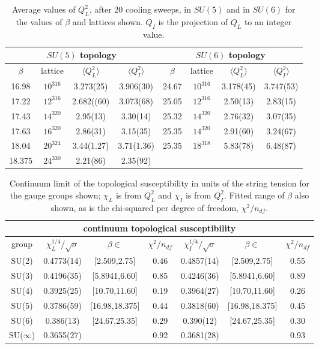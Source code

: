 \documentclass[12pt]{article}
\begin{document}
\begin{table}[htb]
\centering
\begin{tabular}{|c|c|c|c||c|c|c|c|} \hline
\multicolumn{4}{|c|}{$SU(5)$ topology} & \multicolumn{4}{|c|}{$SU(6)$ topology} \\ \hline
$\beta$  &  lattice  & $\langle Q^2_L \rangle$ & $\langle Q_I^2 \rangle$
& $\beta$  &  lattice  & $\langle Q^2_L \rangle$ & $\langle Q_I^2 \rangle$ \\ \hline
16.98   & $10^316$  & 3.273(25)  & 3.906(30) & 24.67   & $10^316$  & 3.178(45)  & 3.747(53) \\
17.22   & $12^316$  & 2.682((60) & 3.073(68) & 25.05   & $12^316$  & 2.50(13)  & 2.83(15) \\
17.43   & $14^320$  & 2.95(13)   & 3.30(14)  & 25.32   & $14^320$  & 2.76(32)  & 3.07(35) \\
17.63   & $16^320$  & 2.86(31)   & 3.15(35)  & 25.35   & $14^320$  & 2.91(60)  & 3.24(67) \\
18.04   & $20^324$  & 3.44(1.27) & 3.71(1.36)& 25.35   & $18^318$  & 5.83(78)  & 6.48(87) \\
18.375  & $24^330$  & 2.21(86)   & 2.35(92)  &    &   &   &  \\ \hline
\end{tabular}
\caption{Average values of $Q^2_L$, after 20 cooling sweeps, in $SU(5)$ and in  $SU(6)$
  for the values of $\beta$ and lattices shown.
  $Q_I$ is the projection of $Q_L$ to an integer value.}
\label{table_QQ_SU5_SU6}
\end{table}



\begin{table}[htb]
\centering
\begin{tabular}{|c|ccc|ccc|} \hline
\multicolumn{7}{|c|}{continuum topological susceptibility} \\ \hline
group  &  $\chi_L^{1/4}/\surd\sigma$ & $\beta\in$ & $\chi^2/n_{df}$ & $\chi_I^{1/4}/\surd\sigma$ & $\beta\in$ & $\chi^2/n_{df}$  \\ \hline
SU(2) & 0.4773(14) & [2.509,2.75]   & 0.46 & 0.4857(14) & [2.509,2.75]   & 0.55 \\
SU(3) & 0.4196(35) & [5.8941,6.60]  & 0.85 & 0.4246(36) & [5.8941,6.60]  & 0.89 \\
SU(4) & 0.3925(25) & [10.70,11.60]  & 0.19 & 0.3964(27) & [10.70,11.60]  & 0.26 \\
SU(5) & 0.3786(59) & [16.98,18.375] & 0.44 & 0.3818(60) & [16.98,18.375] & 0.45  \\
SU(6) & 0.386(13)  & [24.67,25.35]  & 0.29 & 0.390(12)  & [24.67,25.35]  & 0.30 \\ \hline
SU($\infty$) & 0.3655(27)  &        & 0.92 & 0.3681(28) &                & 0.93 \\ \hline
\end{tabular}
\caption{Continuum limit of the topological susceptibility in units of the string tension for the
  gauge groups shown; $\chi_L$ is from $Q^2_L$ and $\chi_I$ is from $Q^2_I$. Fitted range of $\beta$
  also shown, as is the chi-squared per degree of freedom, $\chi^2/n_{df}$.}
\label{table_khiK_SUN_cont}
\end{table}
\end{document}

